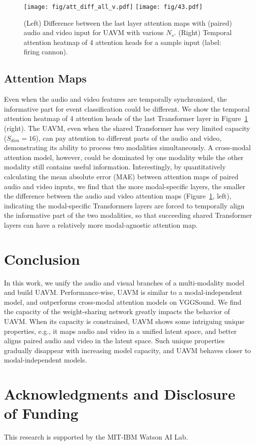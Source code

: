 \documentclass[journal]{IEEEtran}
\newcommand{\squeezeup}{\vspace{-1.6mm}}
\newcommand{\rev}[1]{{\color{dblue} #1}}
\begin{document}
\begin{figure}[t]
\minipage{2.4cm}
  \texttt{[image: fig/att\_diff\_all\_v.pdf]}
\endminipage\hfill
\minipage{6.5cm}
  \texttt{[image: fig/43.pdf]}
\endminipage
\vspace{-0.5em}
\caption{(Left) Difference between the last layer attention maps with (paired) audio and video input for UAVM with various $N_s$. (Right) Temporal attention heatmap of 4 attention heads for a sample input (label: firing cannon). }
\label{fig:exp4}
\vspace{-1.0em}
\end{figure}

\squeezeup\squeezeup
\subsection{Attention Maps}

Even when the audio and video features are temporally synchronized, the informative part for event classification could be different. We show the temporal attention heatmap of 4 attention heads of the last Transformer layer in Figure~\ref{fig:exp4} (right). The UAVM, even when the shared Transformer has very limited capacity ($S_{dim}=16$), can pay attention to different parts of the audio and video, demonstrating its ability to process two modalities simultaneously. A cross-modal attention model, however, could be dominated by one modality while the other modality still contains useful information. Interestingly, by quantitatively calculating the mean absolute error (MAE) between attention maps of paired audio and video inputs, we find that the more modal-specific layers, the smaller the difference between the audio and video attention maps (Figure~\ref{fig:exp4}, left), indicating the modal-specific Transformers layers are forced to temporally align the informative part of the two modalities, so that succeeding shared Transformer layers can have a relatively more modal-agnostic attention map. 

\squeezeup
\section{Conclusion}

\rev{In this work, we unify the audio and visual branches of a multi-modality model and build UAVM. Performance-wise, UAVM is similar to a modal-independent model, and outperforms cross-modal attention models on VGGSound. We find the capacity of the weight-sharing network greatly impacts the behavior of UAVM. When its capacity is constrained, UAVM shows some intriguing unique properties, e.g., it maps audio and video in a unified latent space, and better aligns paired audio and video in the latent space. Such unique properties gradually disappear with increasing model capacity, and UAVM behaves closer to modal-independent models.}

\section{Acknowledgments and Disclosure of Funding}
\rev{This research is supported by the MIT-IBM Watson AI Lab.}



\end{document}
